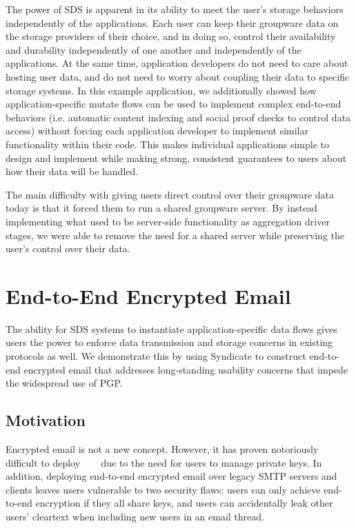 The power of SDS is apparent in its ability to meet the user's storage behaviors
independently of the applications.  Each user can keep their groupware data on
the storage providers of their choice, and in doing so, control their
availability and durability independently of one another and independently of
the applications.  At the same time, application developers do not need to care
about hosting user data, and do not need to worry about coupling their data to
specific storage systems.  In this example application, we additionally showed
how application-specific mutate flows can be used to implement complex
end-to-end behaviors (i.e. automatic content indexing and social proof checks to
control data access) without forcing each
application developer to implement similar functionality within their
code.  This makes individual applications simple to design and implement
while making strong, consistent guarantees to users about how their data will be
handled.

The main difficulty with giving users direct control over their groupware data
today is that it forced them to run a shared groupware server.  By instead
implementing what used to be server-side functionality as aggregation driver
stages, we were able to remove the need for a shared server while preserving the
user's control over their data.

\section{End-to-End Encrypted Email}

The ability for SDS systems to instantiate application-specific data flows gives
users the power to enforce data transmission and storage concerns in existing
protocols as well.  We demonstrate this by using Syndicate to construct
end-to-end encrypted email that addresses long-standing
usability concerns that impede the widespread use of PGP.

\subsection{Motivation}

Encrypted email is not a new concept.  However, it has proven notoriously difficult to
deploy~\cite{why-jonny-cant-encrypt}~\cite{why-jonny-still-cant-encrypt}
~\cite{why-jonny-still-still-cant-encrypt} due to the need for users to manage
private keys.  In addition, deploying end-to-end encrypted email over legacy
SMTP servers and clients leaves users vulnerable to two security flaws:  users
can only achieve end-to-end encryption if they all share keys, and users can
accidentally leak other users' cleartext when including new users in an email
thread.

